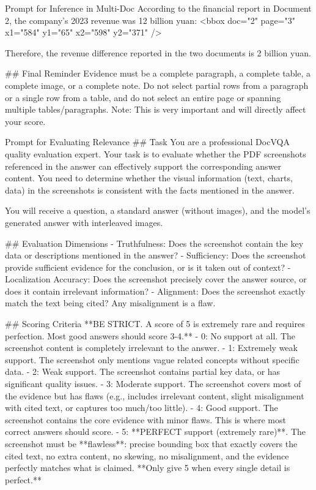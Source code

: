 \documentclass[]{opendatalab}
\begin{document}
{{{\begin{promptbox}[breakable]{Prompt for Inference in Multi-Doc}
According to the financial report in Document 2, the company's 2023 revenue was 12 billion yuan:
<bbox doc="2" page="3" x1="584" y1="65" x2="598" y2="371" />

Therefore, the revenue difference reported in the two documents is 2 billion yuan.

## Final Reminder
Evidence must be a complete paragraph, a complete table, a complete image, or a complete note. Do not select partial rows from a paragraph or a single row from a table, and do not select an entire page or spanning multiple tables/paragraphs. Note: This is very important and will directly affect your score.
\end{promptbox}


\begin{promptbox}[breakable]{Prompt for Evaluating Relevance}
## Task
You are a professional DocVQA quality evaluation expert. Your task is to evaluate whether the PDF screenshots referenced in the answer can effectively support the corresponding answer content. You need to determine whether the visual information (text, charts, data) in the screenshots is consistent with the facts mentioned in the answer.

You will receive a question, a standard answer (without images), and the model's generated answer with interleaved images.

## Evaluation Dimensions
- Truthfulness: Does the screenshot contain the key data or descriptions mentioned in the answer?
- Sufficiency: Does the screenshot provide sufficient evidence for the conclusion, or is it taken out of context?
- Localization Accuracy: Does the screenshot precisely cover the answer source, or does it contain irrelevant information?
- Alignment: Does the screenshot exactly match the text being cited? Any misalignment is a flaw.

## Scoring Criteria
**BE STRICT. A score of 5 is extremely rare and requires perfection. Most good answers should score 3-4.**
- 0: No support at all. The screenshot content is completely irrelevant to the answer.
- 1: Extremely weak support. The screenshot only mentions vague related concepts without specific data.
- 2: Weak support. The screenshot contains partial key data, or has significant quality issues.
- 3: Moderate support. The screenshot covers most of the evidence but has flaws (e.g., includes irrelevant content, slight misalignment with cited text, or captures too much/too little).
- 4: Good support. The screenshot contains the core evidence with minor flaws. This is where most correct answers should score.
- 5: **PERFECT support (extremely rare)**. The screenshot must be **flawless**: precise bounding box that exactly covers the cited text, no extra content, no skewing, no misalignment, and the evidence perfectly matches what is claimed. **Only give 5 when every single detail is perfect.**


\end{promptbox}}}}
\end{document}
